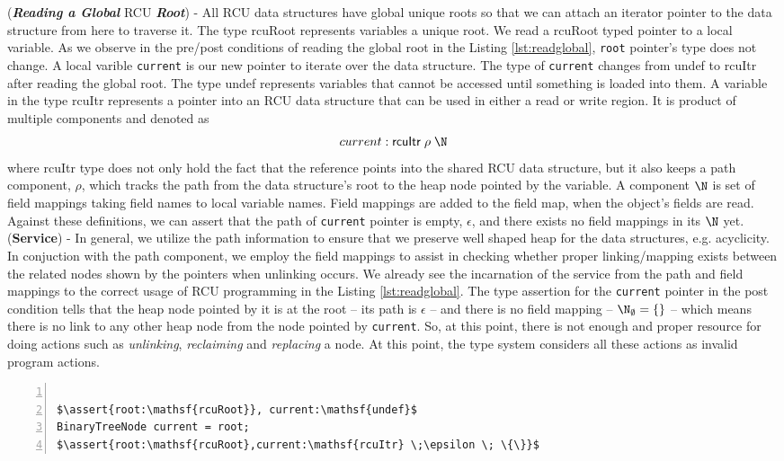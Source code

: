 (\textit{\textbf{Reading a Global}} \textsf{RCU} \textit{\textbf{Root}}) - All \textsf{RCU} data structures have global unique roots so that we can attach an iterator pointer to the data structure from here to traverse it. The type \textsf{rcuRoot} represents variables a unique root. We read a \textsf{rcuRoot} typed pointer to a local variable. As we observe in the pre/post conditions of reading the global root in the Listing \ref{lst:readglobal}, \texttt{root} pointer's type does not change. A local varible \texttt{current} is our new pointer to iterate over the data structure. The type of \texttt{current} changes from \textsf{undef} to \textsf{rcuItr} after reading the global root. The type \textsf{undef} represents variables that cannot be accessed until something is loaded into them. A variable in the type \textsf{rcuItr} represents a pointer into an RCU data structure that can be used in either a read or write region. It is product of multiple components and denoted as
\[current: \mathsf{rcuItr}\; \rho \; \N \]
where \textsf{rcuItr} type does not only hold the fact that the reference points into the shared RCU data structure, but it also keeps a path component, $\rho$, which tracks the path from the data structure's root to the heap node pointed by the variable. A component $\N$ is set of field mappings taking field names to local variable names. Field mappings are added to the field map, when the object's fields are read. Against these definitions,  we can assert that the path of \texttt{current} pointer is empty, $\epsilon$, and there exists no field mappings in its $\N$ yet. (\textbf{Service}) - In general, we utilize the path information to ensure that we preserve well shaped heap for the data structures, e.g. acyclicity. In conjuction with the path component, we employ the field mappings to assist in checking whether proper linking/mapping exists between the related nodes shown by the pointers when unlinking occurs. We already see the incarnation of the service from the path and field mappings to the correct usage of \textsf{RCU} programming in the Listing \ref{lst:readglobal}. The type assertion for the \texttt{current} pointer in the post condition tells that the heap node pointed by it is at the root -- its path is $\epsilon$ -- and there is no field mapping -- $\N_{\emptyset} = \{\}$  -- which means there is no link to any other heap node from the node pointed by \texttt{current}. So, at this point, there is not enough and proper resource for doing actions such as \textit{unlinking}, \textit{reclaiming} and \textit{replacing} a node. At this point, the type system considers all these actions as invalid program actions.  
\begin{lstlisting}[caption={Reading a global variable},label={lst:readglobal}, numbers=left, numberstyle=\tiny\color{red}, numbersep=5pt]%, basicstyle=\scriptsize]

$\assert{root:\mathsf{rcuRoot}}, current:\mathsf{undef}$
BinaryTreeNode current = root;
$\assert{root:\mathsf{rcuRoot},current:\mathsf{rcuItr} \;\epsilon \; \{\}}$
\end{lstlisting}


